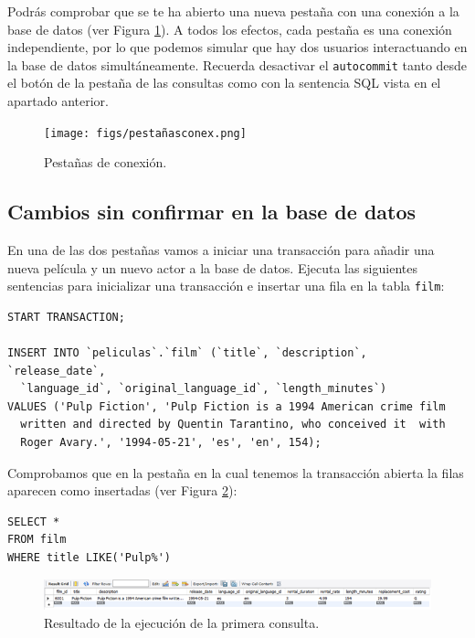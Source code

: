 \documentclass[a4paper]{article}
\begin{document}
Podrás comprobar que se te ha abierto una nueva pestaña con una conexión a la base de datos (ver Figura \ref{fig:pestañas}). A todos los efectos, cada pestaña es una conexión independiente, por lo que podemos simular que hay dos usuarios interactuando en la base de datos simultáneamente. Recuerda desactivar el \texttt{autocommit} tanto desde el botón de la pestaña de las consultas como con la sentencia SQL vista en el apartado anterior.

\begin{figure}[ht]
    \centering
    \texttt{[image: figs/pestañasconex.png]}
    \caption{Pestañas de conexión.}\label{fig:pestañas}
\end{figure}

\subsection*{Cambios sin confirmar en la base de datos}

En una de las dos pestañas vamos a iniciar una transacción para añadir una nueva película y un nuevo actor a la base de datos. Ejecuta las siguientes sentencias para inicializar una transacción e insertar una fila en la tabla \texttt{film}:

\begin{verbatim}
START TRANSACTION;

INSERT INTO `peliculas`.`film` (`title`, `description`, `release_date`, 
  `language_id`, `original_language_id`, `length_minutes`) 
VALUES ('Pulp Fiction', 'Pulp Fiction is a 1994 American crime film 
  written and directed by Quentin Tarantino, who conceived it  with 
  Roger Avary.', '1994-05-21', 'es', 'en', 154);
\end{verbatim}

Comprobamos que en la pestaña en la cual tenemos la transacción abierta la filas aparecen como insertadas (ver Figura \ref{fig:1consulta}):

\begin{verbatim}
SELECT * 
FROM film
WHERE title LIKE('Pulp%')
\end{verbatim}

\begin{figure}[ht]
    \centering
    \includegraphics[width=0.9\columnwidth]{figs/1consulta.png}
    \caption{Resultado de la ejecución de la primera consulta.}\label{fig:1consulta}
\end{figure}
\end{document}
